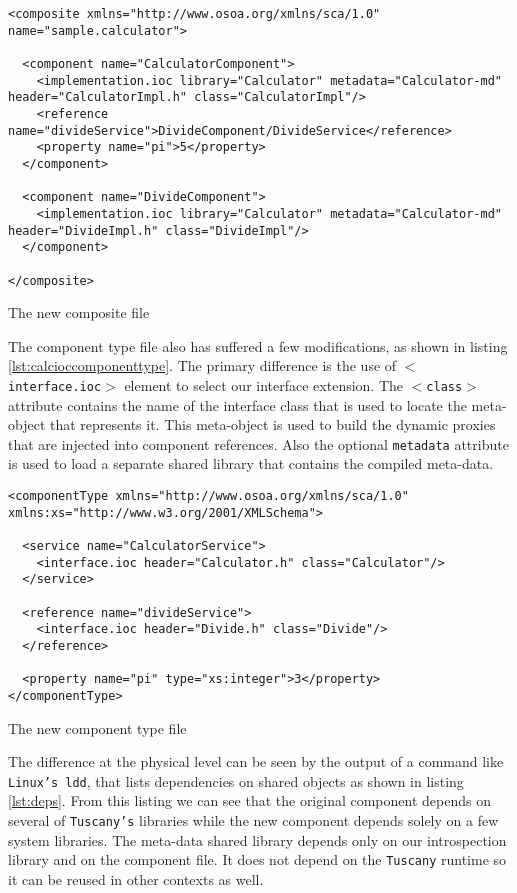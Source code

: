 \begin{listing}
\begin{verbatim}
<composite xmlns="http://www.osoa.org/xmlns/sca/1.0" name="sample.calculator">

  <component name="CalculatorComponent">
    <implementation.ioc library="Calculator" metadata="Calculator-md" header="CalculatorImpl.h" class="CalculatorImpl"/>
    <reference name="divideService">DivideComponent/DivideService</reference>
    <property name="pi">5</property>
  </component>
        
  <component name="DivideComponent">
    <implementation.ioc library="Calculator" metadata="Calculator-md" header="DivideImpl.h" class="DivideImpl"/>
  </component>

</composite>
\end{verbatim}
\caption{The new composite file}
\label{lst:calcioccomposite}
\end{listing}

The component type file also has suffered a few modifications, as shown in listing \ref{lst:calcioccomponenttype}.
The primary difference is the use of \texttt{$<$interface.ioc$>$} element to select our interface extension.
The \texttt{$<$class$>$} attribute contains the name of the interface class that is used to locate the
meta-object that represents it. This meta-object is used to build the dynamic proxies that are injected into
component references. Also the optional \texttt{metadata} attribute is used to load a separate shared library
that contains the compiled meta-data.

\begin{listing}
\begin{verbatim}
<componentType xmlns="http://www.osoa.org/xmlns/sca/1.0" xmlns:xs="http://www.w3.org/2001/XMLSchema">

  <service name="CalculatorService">
    <interface.ioc header="Calculator.h" class="Calculator"/>
  </service>

  <reference name="divideService">
    <interface.ioc header="Divide.h" class="Divide"/>
  </reference>
  
  <property name="pi" type="xs:integer">3</property>
</componentType>
\end{verbatim}
\caption{The new component type file}
\label{lst:calcioccomponenttype}
\end{listing}

The difference at the physical level can be seen by the output of a command like \texttt{Linux's ldd}, that lists
dependencies on shared objects as shown in listing \ref{lst:deps}. From this listing we can see that the original
component depends on several of \texttt{Tuscany's} libraries while the new component depends solely on a few system
libraries. The meta-data shared library depends only on our introspection library and on the component file. It does
not depend on the \texttt{Tuscany} runtime so it can be reused in other contexts as well.


